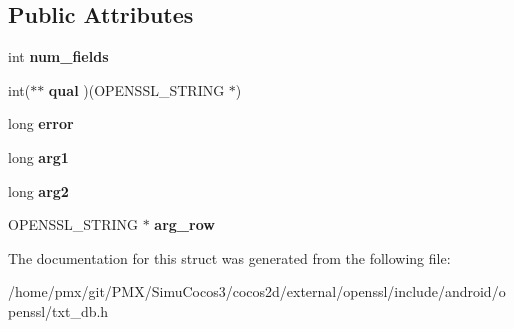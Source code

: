 \subsection*{Public Attributes}
\begin{DoxyCompactItemize}
\item 
\mbox{\label{structtxt__db__st_ac5e40d76de4af9e3eb8126c5c71f35ee}} 
int {\bfseries num\+\_\+fields}
\item 
\mbox{\label{structtxt__db__st_a6184b30eaccfc73b618df59d3cec9a40}} 
int($\ast$$\ast$ {\bfseries qual} )(O\+P\+E\+N\+S\+S\+L\+\_\+\+S\+T\+R\+I\+NG $\ast$)
\item 
\mbox{\label{structtxt__db__st_addce5883079df416612638f30157ba9d}} 
long {\bfseries error}
\item 
\mbox{\label{structtxt__db__st_ae3f2f91927e152a865eecf288a8a5190}} 
long {\bfseries arg1}
\item 
\mbox{\label{structtxt__db__st_ae99864667eb99fd2d18fc91293df6249}} 
long {\bfseries arg2}
\item 
\mbox{\label{structtxt__db__st_a7193551035418580268378625bc0b9ec}} 
O\+P\+E\+N\+S\+S\+L\+\_\+\+S\+T\+R\+I\+NG $\ast$ {\bfseries arg\+\_\+row}
\end{DoxyCompactItemize}


The documentation for this struct was generated from the following file\+:\begin{DoxyCompactItemize}
\item 
/home/pmx/git/\+P\+M\+X/\+Simu\+Cocos3/cocos2d/external/openssl/include/android/openssl/txt\+\_\+db.\+h\end{DoxyCompactItemize}

